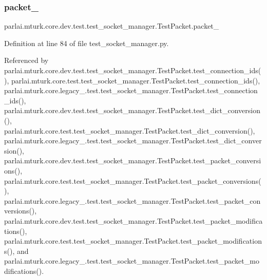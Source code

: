 \subsubsection{\texorpdfstring{packet\+\_}{packet\_1}}
{\footnotesize\ttfamily parlai.\+mturk.\+core.\+dev.\+test.\+test\+\_\+socket\+\_\+manager.\+Test\+Packet.\+packet\+\_}



Definition at line 84 of file test\+\_\+socket\+\_\+manager.\+py.



Referenced by parlai.\+mturk.\+core.\+dev.\+test.\+test\+\_\+socket\+\_\+manager.\+Test\+Packet.\+test\+\_\+connection\+\_\+ids(), parlai.\+mturk.\+core.\+test.\+test\+\_\+socket\+\_\+manager.\+Test\+Packet.\+test\+\_\+connection\+\_\+ids(), parlai.\+mturk.\+core.\+legacy\+\_.\+test.\+test\+\_\+socket\+\_\+manager.\+Test\+Packet.\+test\+\_\+connection\+\_\+ids(), parlai.\+mturk.\+core.\+dev.\+test.\+test\+\_\+socket\+\_\+manager.\+Test\+Packet.\+test\+\_\+dict\+\_\+conversion(), parlai.\+mturk.\+core.\+test.\+test\+\_\+socket\+\_\+manager.\+Test\+Packet.\+test\+\_\+dict\+\_\+conversion(), parlai.\+mturk.\+core.\+legacy\+\_.\+test.\+test\+\_\+socket\+\_\+manager.\+Test\+Packet.\+test\+\_\+dict\+\_\+conversion(), parlai.\+mturk.\+core.\+dev.\+test.\+test\+\_\+socket\+\_\+manager.\+Test\+Packet.\+test\+\_\+packet\+\_\+conversions(), parlai.\+mturk.\+core.\+test.\+test\+\_\+socket\+\_\+manager.\+Test\+Packet.\+test\+\_\+packet\+\_\+conversions(), parlai.\+mturk.\+core.\+legacy\+\_.\+test.\+test\+\_\+socket\+\_\+manager.\+Test\+Packet.\+test\+\_\+packet\+\_\+conversions(), parlai.\+mturk.\+core.\+dev.\+test.\+test\+\_\+socket\+\_\+manager.\+Test\+Packet.\+test\+\_\+packet\+\_\+modifications(), parlai.\+mturk.\+core.\+test.\+test\+\_\+socket\+\_\+manager.\+Test\+Packet.\+test\+\_\+packet\+\_\+modifications(), and parlai.\+mturk.\+core.\+legacy\+\_.\+test.\+test\+\_\+socket\+\_\+manager.\+Test\+Packet.\+test\+\_\+packet\+\_\+modifications().

\mbox{\label{classparlai_1_1mturk_1_1core_1_1dev_1_1test_1_1test__socket__manager_1_1TestPacket_a67d1de67cb7e1e7a146d90152f2943c9}} 

